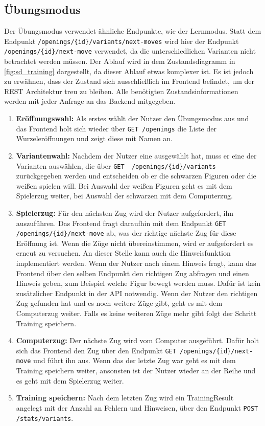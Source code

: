 \clearpage

\subsection{Übungsmodus}
Der Übungsmodus verwendet ähnliche Endpunkte, wie der Lernmodus. Statt dem Endpunkt \lstinline|/openings/{id}/variants/next-moves| wird hier der Endpunkt \lstinline|/openings/{id}/next-move| verwendet, da die unterschiedlichen Varianten nicht betrachtet werden müssen. Der Ablauf wird in dem Zustandsdiagramm in \autoref{fig:sd_training} dargestellt, da dieser Ablauf etwas komplexer ist. Es ist jedoch zu erwähnen, dass der Zustand sich ausschließlich im Frontend befindet, um der REST Architektur treu zu bleiben. Alle benötigten Zustandsinformationen werden mit jeder Anfrage an das Backend mitgegeben.

\begin{enumerate}
    \item \textbf{Eröffnungswahl:} Als erstes wählt der Nutzer den Übungsmodus aus und das Frontend holt sich wieder über \lstinline{GET /openings} die Liste der Wurzeleröffnungen und zeigt diese mit Namen an.
    \item \textbf{Variantenwahl:} Nachdem der Nutzer eine ausgewählt hat, muss er eine der Varianten auswählen, die über \lstinline|GET  /openings/{id}/variants| zurückgegeben werden und entscheiden ob er die schwarzen Figuren oder die weißen spielen will. Bei Auswahl der weißen Figuren geht es mit dem Spielerzug weiter, bei Auswahl der schwarzen mit dem Computerzug.
    \item \textbf{Spielerzug:} Für den nächsten Zug wird der Nutzer aufgefordert, ihn auszuführen. Das Frontend fragt daraufhin mit dem Endpunkt \lstinline|GET /openings/{id}/next-move| ab, was der richtige nächste Zug für diese Eröffnung ist. Wenn die Züge nicht übereinstimmen, wird er aufgefordert es erneut zu versuchen. An dieser Stelle kann auch die Hinweisfunktion implementiert werden. Wenn der Nutzer nach einem Hinweis fragt, kann das Frontend über den selben Endpunkt den richtigen Zug abfragen und einen Hinweis geben, zum Beispiel welche Figur bewegt werden muss. Dafür ist kein zusätzlicher Endpunkt in der API notwendig. Wenn der Nutzer den richtigen Zug gefunden hat und es noch weitere Züge gibt, geht es mit dem Computerzug weiter. Falls es keine weiteren Züge mehr gibt folgt der Schritt Training speichern.
    \item \textbf{Computerzug:} Der nächste Zug wird vom Computer ausgeführt. Dafür holt sich das Frontend den Zug über den Endpunkt \lstinline|GET /openings/{id}/next-move| und führt ihn aus. Wenn das der letzte Zug war geht es mit dem Training speichern weiter, ansonsten ist der Nutzer wieder an der Reihe und es geht mit dem Spielerzug weiter.
    \item \textbf{Training speichern:} Nach dem letzten Zug wird ein TrainingResult angelegt mit der Anzahl an Fehlern und Hinweisen, über den Endpunkt \lstinline|POST /stats/variants|.
\end{enumerate}


